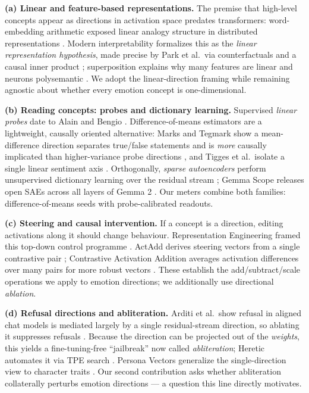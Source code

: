 \documentclass[
]{article}
\begin{document}
\textbf{(a) Linear and feature-based representations.} The premise that
high-level concepts appear as directions in activation space predates
transformers: word-embedding arithmetic exposed linear analogy structure
in distributed representations \citep{mikolov2013linguistic}. Modern
interpretability formalizes this as the \emph{linear representation
hypothesis}, made precise by Park et al.~via counterfactuals and a
causal inner product \citep{park2024linear}; superposition explains why
many features are linear and neurons polysemantic \citep{elhage2022toy}.
We adopt the linear-direction framing while remaining agnostic about
whether every emotion concept is one-dimensional.

\textbf{(b) Reading concepts: probes and dictionary learning.}
Supervised \emph{linear probes} date to Alain and Bengio
\citep{alain2016probes}. Difference-of-means estimators are a
lightweight, causally oriented alternative: Marks and Tegmark show a
mean-difference direction separates true/false statements and is
\emph{more} causally implicated than higher-variance probe directions
\citep{marks2024geometry}, and Tigges et al.~isolate a single linear
sentiment axis \citep{tigges2023sentiment}. Orthogonally, \emph{sparse
autoencoders} perform unsupervised dictionary learning over the residual
stream \citep{bricken2023monosemanticity, templeton2024scaling}; Gemma
Scope releases open SAEs across all layers of Gemma 2
\citep{lieberum2024gemmascope}. Our meters combine both families:
difference-of-means seeds with probe-calibrated readouts.

\textbf{(c) Steering and causal intervention.} If a concept is a
direction, editing activations along it should change behaviour.
Representation Engineering framed this top-down control programme
\citep{zou2023repe}. ActAdd derives steering vectors from a single
contrastive pair \citep{turner2023actadd}; Contrastive Activation
Addition averages activation differences over many pairs for more robust
vectors \citep{rimsky2024caa}. These establish the add/subtract/scale
operations we apply to emotion directions; we additionally use
directional \emph{ablation}.

\textbf{(d) Refusal directions and abliteration.} Arditi et al.~show
refusal in aligned chat models is mediated largely by a single
residual-stream direction, so ablating it suppresses refusals
\citep{arditi2024refusal}. Because the direction can be projected out of
the \emph{weights}, this yields a fine-tuning-free ``jailbreak'' now
called \emph{abliteration}; Heretic automates it via TPE search
\citep{heretic2025}. Persona Vectors generalize the single-direction
view to character traits \citep{chen2025persona}. Our second
contribution asks whether abliteration collaterally perturbs emotion
directions --- a question this line directly motivates.
\end{document}
